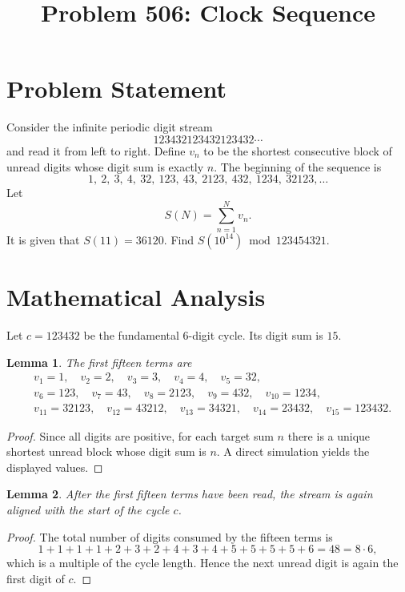 \documentclass[11pt]{article}
\title{Problem 506: Clock Sequence}
\author{}
\date{}
\newtheorem{lemma}{Lemma}
\begin{document}
\maketitle

\section{Problem Statement}

Consider the infinite periodic digit stream
\[
123432123432123432\cdots
\]
and read it from left to right. Define $v_n$ to be the shortest consecutive block of unread digits whose digit sum is exactly $n$. The beginning of the sequence is
\[
1,\ 2,\ 3,\ 4,\ 32,\ 123,\ 43,\ 2123,\ 432,\ 1234,\ 32123,\ldots
\]
Let
\[
S(N)=\sum_{n=1}^{N} v_n.
\]
It is given that $S(11)=36120$. Find $S(10^{14}) \bmod 123454321$.

\section{Mathematical Analysis}

Let $c=123432$ be the fundamental 6-digit cycle. Its digit sum is $15$.

\begin{lemma}
The first fifteen terms are
\[
\begin{aligned}
&v_1=1,\quad v_2=2,\quad v_3=3,\quad v_4=4,\quad v_5=32,\\
&v_6=123,\quad v_7=43,\quad v_8=2123,\quad v_9=432,\quad v_{10}=1234,\\
&v_{11}=32123,\quad v_{12}=43212,\quad v_{13}=34321,\quad v_{14}=23432,\quad v_{15}=123432.
\end{aligned}
\]
\end{lemma}

\begin{proof}
Since all digits are positive, for each target sum $n$ there is a unique shortest unread block whose digit sum is $n$. A direct simulation yields the displayed values.
\end{proof}

\begin{lemma}
After the first fifteen terms have been read, the stream is again aligned with the start of the cycle $c$.
\end{lemma}

\begin{proof}
The total number of digits consumed by the fifteen terms is
\[
1+1+1+1+2+3+2+4+3+4+5+5+5+5+6 = 48 = 8 \cdot 6,
\]
which is a multiple of the cycle length. Hence the next unread digit is again the first digit of $c$.
\end{proof}
\end{document}
